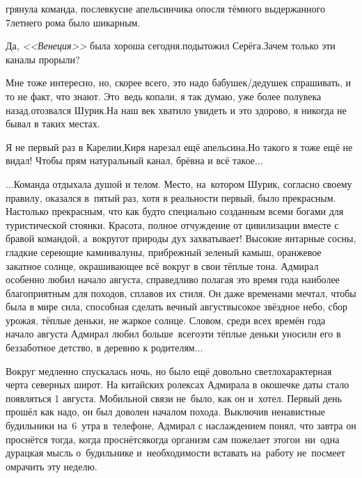 \mdash грянула команда, послевкусие апельсинчика опосля тёмного выдержанного 7\sdash летнего рома было шикарным.

\diagdash Да, \textit{<<Венеция>>} была хороша сегодня.\mdash подытожил Серёга.\mdash Зачем только эти каналы прорыли?

\diagdash Мне тоже интересно, но, скорее всего, это надо бабушек/дедушек спрашивать, и то не факт, что знают. Это~ведь копали, я так думаю, уже более полувека назад.\mdash отозвался Шурик.\mdash На наш век хватило увидеть и это здорово, я никогда не бывал в таких местах.

\diagdash Я не первый раз в Карелии,\mdash Киря нарезал ещё апельсина.\mdash Но такого я тоже ещё не видал! Чтобы прям натуральный канал, брёвна и всё такое$\ldots$

\vspace{0.2cm}
$\ldots$Команда отдыхала душой и телом. Место, на~котором Шурик, согласно своему правилу, оказался в~пятый раз, хотя в реальности первый, было прекрасным. Настолько прекрасным, что как будто специально созданным всеми богами для туристической стоянки. Красота, полное отчуждение от цивилизации вместе с бравой командой, а~вокруг\mdash от природы дух захватывает! Высокие янтарные сосны, гладкие сереющие камни\sdash валуны, прибрежный зеленый камыш, оранжевое закатное солнце, окрашивающее всё вокруг в свои тёплые тона. Адмирал особенно любил начало августа, справедливо полагая это время года наиболее благоприятным для походов, сплавов их стиля. Он даже временами мечтал, чтобы была в мире сила, способная сделать вечный август\mdash высокое звёздное небо, сбор урожая, тёплые деньки, не жаркое солнце. Словом, среди всех времён года начало августа Адмирал любил больше~всего\mdash эти тёплые деньки уносили его в беззаботное детство, в деревню к родителям$\ldots$

Вокруг медленно спускалась ночь, но было ещё довольно светло\mdash характерная черта северных широт. На китайских ролексах Адмирала в окошечке даты стало появляться 1 августа. Мобильной связи не~было, как он и~хотел. Первый день прошёл как надо, он был доволен началом похода. Выключив ненавистные будильники на~6~утра в~телефоне, Адмирал с наслаждением понял, что завтра он проснётся тогда, когда проснётся\mdash когда организм сам пожелает этого\mdash и~ни~одна дурацкая мысль о~будильнике и~необходимости вставать на~работу не~посмеет омрачить эту неделю. 

\begin{center}
\end{center}